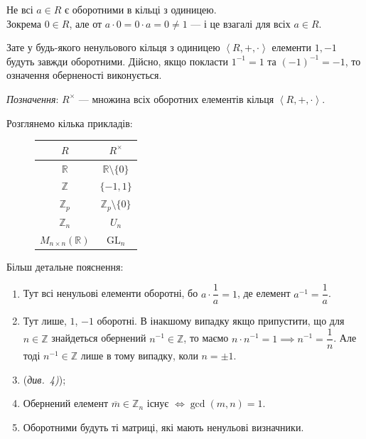 \documentclass{math_library}
\begin{document}
\begin{remark}
Не всі $a \in R$ є оборотними в кільці з одиницею.\\
Зокрема $0 \in R$, але от $a \cdot 0 = 0 \cdot a = 0 \neq 1$ --- і це взагалі для всіх $a \in R$.
\end{remark}

\begin{remark}
Зате у будь-якого ненульового кільця з одиницею $\left<R,+,\cdot \right>$ елементи $1,-1$ будуть завжди оборотними. Дійсно, якщо покласти $1^{-1} = 1$ та $(-1)^{-1} = -1$, то означення оберненості виконується.
\end{remark}

\textit{Позначення}: $R^\times$ --- множина всіх оборотних елементів кільця $\left<R,+,\cdot \right>$.

\begin{example}
Розглянемо кілька прикладів:
\begin{figure}[H]
\centering
\begin{tabular}{c|c}
$R$ & $R^\times$ \\
\hline
$\mathbb{R}$ & $\mathbb{R} \setminus \{0\}$ \\
$\mathbb{Z}$ & $\{-1,1\}$ \\
$\mathbb{Z}_p$ & $\mathbb{Z}_p \setminus \{0\}$ \\
$\mathbb{Z}_n$ & $U_n$ \\
$M_{n \times n}(\mathbb{R})$ & $\mathrm{GL}_n$ \\
\end{tabular}
\end{figure}
Більш детальне пояснення:
\begin{enumerate}[wide=0pt,label={\arabic*)}]
\item Тут всі ненульові елементи оборотні, бо $a \cdot \dfrac{1}{a} = 1$, де елемент $a^{-1} = \dfrac{1}{a}$.
\item Тут лише, $1$, $-1$ оборотні. В інакшому випадку якщо припустити, що для $n \in \mathbb{Z}$ знайдеться обернений $n^{-1} \in \mathbb{Z}$, то маємо $n \cdot n^{-1} = 1 \implies n^{-1} = \dfrac{1}{n}$. Але тоді $n^{-1} \in \mathbb{Z}$ лише в тому випадку, коли $n = \pm 1$.
\item (\textit{див.\ 4)});
\item Обернений елемент $\overline{m} \in \mathbb{Z}_n$ існує $\iff \gcd(m,n) = 1$.
\item Оборотними будуть ті матриці, які мають ненульові визначники.
\end{enumerate}
\end{example}
\end{document}
